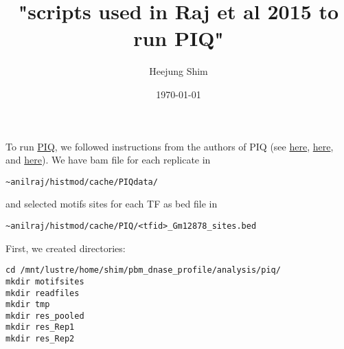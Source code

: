 \documentclass[11pt]{article}
\author{Heejung Shim}
\date{\today}
\title{"scripts used in Raj et al 2015 to run PIQ"}
\begin{document}
\maketitle
\tableofcontents

To run \href{https://bitbucket.org/thashim/piq-single/}{PIQ}, we followed instructions from the authors of PIQ (see \href{https://bitbucket.org/thashim/piq-single/issue/5/running-piq-on-pre-selected-motif-sites}{here}, \href{https://bitbucket.org/thashim/piq-single/issue/6/running-piq-with-two-library-replicates}{here}, and \href{https://bitbucket.org/thashim/piq-single/issue/7/interpreting-piq-output}{here}). We have bam file for each replicate in
\begin{lstlisting}
~anilraj/histmod/cache/PIQdata/
\end{lstlisting}
and selected motifs sites for each TF as bed file in 
\begin{lstlisting}
~anilraj/histmod/cache/PIQ/<tfid>_Gm12878_sites.bed
\end{lstlisting}


First, we created directories:
\begin{lstlisting}
cd /mnt/lustre/home/shim/pbm_dnase_profile/analysis/piq/
mkdir motifsites
mkdir readfiles
mkdir tmp
mkdir res_pooled
mkdir res_Rep1
mkdir res_Rep2
\end{lstlisting}
\end{document}
